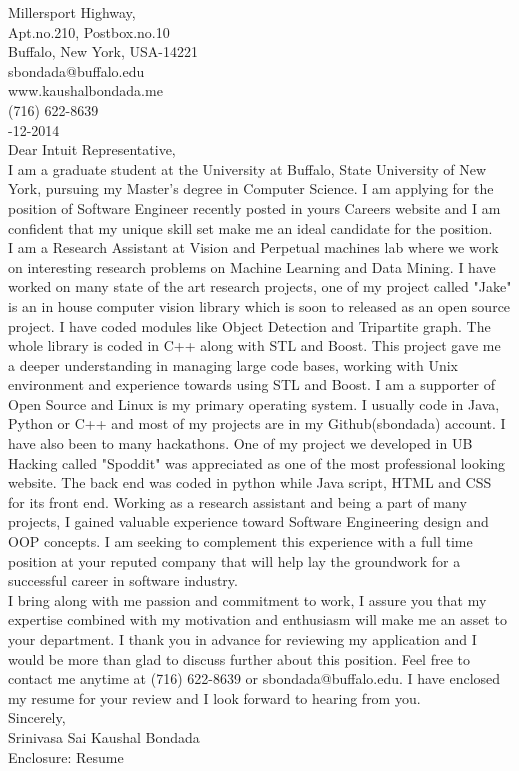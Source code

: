 \documentclass[10pt,letterpaper,oneside]{article}
\begin{document}
 Millersport Highway,\\
Apt.no.210, Postbox.no.10\\
Buffalo, New York, USA-14221\\
sbondada@buffalo.edu\\
www.kaushalbondada.me\\
(716) 622-8639\\

-12-2014\\
 
\noindent Dear Intuit Representative,\\
 
I am a graduate student at the University at Buffalo, State University of New York, pursuing my
Master's degree in Computer Science. I am applying for the position of Software Engineer
recently posted in yours Careers website and I am confident that my unique skill set make me an ideal candidate for the position.\\

I am a Research Assistant at Vision and Perpetual machines lab where we work on interesting research problems on
Machine Learning and Data Mining. I have worked on many state of the art research projects, one of my
project called "Jake" is an in house computer vision library which is soon to released as an
open source project. I have coded modules like Object Detection and Tripartite graph. The whole library
is coded in C++ along with STL and Boost. This project gave me a deeper understanding in managing large code bases, working with Unix environment and experience towards using STL and Boost. I am a supporter of Open Source and 
Linux is my primary operating system. I usually code in Java, Python or C++ and most of my projects are in my Github(sbondada) account. I have also been to many hackathons.
One of my project we developed in UB Hacking called "Spoddit" was appreciated as one of the most professional looking website. The back end
was coded in python while Java script, HTML and CSS for its front end. Working as a research assistant and being a part of many projects, I
gained valuable experience toward Software Engineering design and OOP concepts. I am seeking to complement this experience with a full time position at your reputed company that will help lay the groundwork for a successful career in software industry.\\

I bring along with me passion and commitment to work, I assure you that my expertise combined with my motivation
and enthusiasm will make me an asset to your department. I thank you in advance for reviewing my application and I would be more than glad to
discuss further about this position. Feel free to contact me anytime at (716) 622-8639 or sbondada@buffalo.edu. I have enclosed my resume for your review and I look forward to hearing from you.\\
 
\noindent Sincerely,\\
Srinivasa Sai Kaushal Bondada\\
Enclosure: Resume\\
\end{document}
